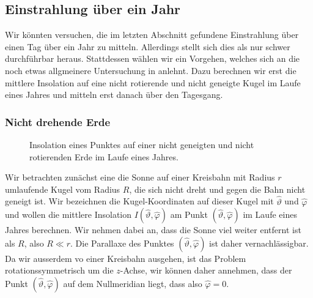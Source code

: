 %
%
%
\subsection{Einstrahlung über ein Jahr}
Wir könnten versuchen, die im letzten Abschnitt gefundene Einstrahlung
über einen Tag über ein Jahr zu mitteln.
Allerdings stellt sich dies als nur schwer durchführbar heraus.
Stattdessen wählen wir ein Vorgehen, welches  sich an die 
noch etwas allgmeinere Untersuchung in 
\cite[section 5]{skript:mcgeheelehman}
anlehnt.
Dazu berechnen wir erst die mittlere Insolation auf eine nicht
rotierende und nicht geneigte Kugel im Laufe eines Jahres und
mitteln erst danach über den Tagesgang.

\subsubsection{Nicht drehende Erde}
\begin{figure}%
\centering%
\caption{Insolation eines Punktes auf einer nicht geneigten 
und nicht rotierenden Erde im Laufe eines Jahres.
\label{skript:insolation:fest}}
\end{figure}%
Wir betrachten zunächst eine die Sonne auf einer Kreisbahn mit Radius $r$
umlaufende Kugel vom Radius $R$, die sich nicht dreht und gegen die Bahn
nicht geneigt ist.
Wir bezeichnen die Kugel-Koordinaten auf dieser Kugel mit $\hat\vartheta$
und $\hat\varphi$ und wollen die mittlere Insolation
$I(\hat\vartheta,\hat\varphi)$ am Punkt $(\hat\vartheta,\hat\varphi)$
im Laufe eines Jahres berechnen.
Wir nehmen dabei an, dass die Sonne viel weiter entfernt ist als $R$,
also $R\ll r$.
Die Parallaxe des Punktes $(\hat\vartheta,\hat\varphi)$ ist daher
vernachlässigbar.
Da wir ausserdem vo einer Kreisbahn ausgehen, ist das Problem
rotationssymmetrisch um die $z$-Achse, wir können daher annehmen, dass
der Punkt $(\hat\vartheta,\hat\varphi)$ auf dem Nullmeridian liegt,
dass also $\hat\varphi=0$.

